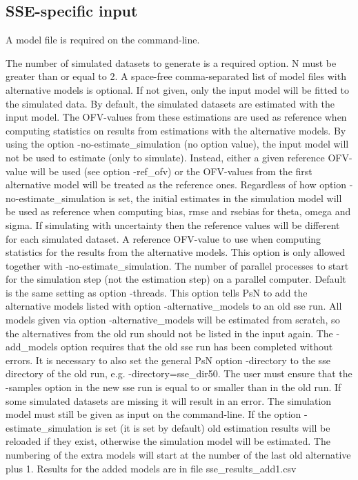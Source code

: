\subsection{SSE-specific input}
A model file is required on the command-line.
\begin{optionlist}
The number of simulated datasets to generate is a required option. N must be greater than or equal to 2. 
\nextopt
{}
A space-free comma-separated list of model files with alternative models is optional. If not given, only the input model will be fitted to the simulated data. 
\nextopt
{}
By default, the simulated datasets are estimated with the input model. The OFV-values from these estimations are used as reference when computing statistics on results from estimations with the alternative models. By using the option -no-estimate\_simulation (no option value), the input model will not be used to estimate (only to simulate). Instead, either a given reference OFV-value will be used (see option -ref\_ofv) or the OFV-values from the first alternative model will be treated as the reference ones. Regardless of how option -no-estimate\_simulation is set, the initial estimates in the simulation model will be used as reference when computing bias, rmse and rsebias for theta, omega and sigma. If simulating with uncertainty then the reference values will be different for each simulated dataset. 
\nextopt
{}
A reference OFV-value to use when computing statistics for the results from the alternative models. This option is only allowed together with -no-estimate\_simulation. 
\nextopt
{}
The number of parallel processes to start for the simulation step (not the estimation step) on a parallel computer. Default is the same setting as option -threads. 
\nextopt
{}
This option tells PsN to add the alternative models listed with option -alternative\_models to an old sse run. All models given via option -alternative\_models will be estimated from scratch, so the alternatives from the old run should not be listed in the input again. The -add\_models option requires that the old sse run has been completed without errors. It is necessary to also set the general PsN option -directory to the sse directory of the old run,       e.g. -directory=sse\_dir50. The user must ensure that the -samples option in the new sse run is equal to or smaller than in the old run. If some simulated datasets are missing it will result in an error.       The simulation model must still be given as input on the command-line. If the option -estimate\_simulation is set (it is set by default) old estimation results will be reloaded if they exist, otherwise the simulation model will be estimated. The numbering of the extra models will start at the number of the last old alternative plus 1. Results for the added models are in file sse\_results\_add1.csv 

\end{optionlist}

